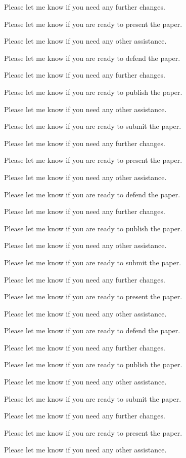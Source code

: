Please let me know if you need any further changes. 

Please let me know if you are ready to present the paper. 

Please let me know if you need any other assistance. 

Please let me know if you are ready to defend the paper. 

Please let me know if you need any further changes. 

Please let me know if you are ready to publish the paper. 

Please let me know if you need any other assistance. 

Please let me know if you are ready to submit the paper. 

Please let me know if you need any further changes. 

Please let me know if you are ready to present the paper. 

Please let me know if you need any other assistance. 

Please let me know if you are ready to defend the paper. 

Please let me know if you need any further changes. 

Please let me know if you are ready to publish the paper. 

Please let me know if you need any other assistance. 

Please let me know if you are ready to submit the paper. 

Please let me know if you need any further changes. 

Please let me know if you are ready to present the paper. 

Please let me know if you need any other assistance. 

Please let me know if you are ready to defend the paper. 

Please let me know if you need any further changes. 

Please let me know if you are ready to publish the paper. 

Please let me know if you need any other assistance. 

Please let me know if you are ready to submit the paper. 

Please let me know if you need any further changes. 

Please let me know if you are ready to present the paper. 

Please let me know if you need any other assistance. 

